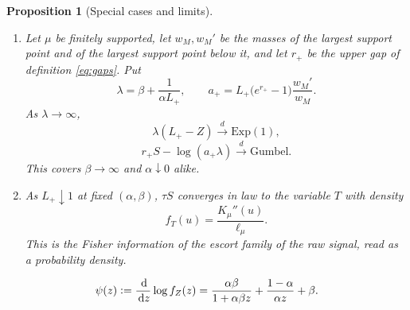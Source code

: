 \documentclass[10pt,a4paper]{amsart}
\newtheorem{proposition}{Proposition}
\providecommand{\Leh}{\mathscr{L}}
\providecommand{\dd}{\,\mathrm{d}}
\providecommand{\eqdef}{\mathrel{\vcentcolon=}}
\begin{document}
\begin{proposition}[Special cases and limits]
\begin{enumerate}[label=\textup{(\roman*)},leftmargin=2.2em]
			$Y=\Leh_\nu(S)-1=W_0(U)$ with $U$ uniform on $(0,1)$.
			\item Let $\mu$ be finitely supported, let $w_M,w_M'$ be the masses
			of the largest support point and of the largest support point
			below it, and let $r_+$ be the upper gap of definition
			\eqref{eq:gaps}. Put
			\begin{equation}\label{eq:lambdaa}
				\lambda=\beta+\frac{1}{\alpha L_+},
				\qquad
				a_+=L_+\bigl(e^{r_+}-1\bigr)\frac{w_M'}{w_M} .
			\end{equation}
			As $\lambda\to\infty$,
			\begin{equation}\label{eq:gumbel}
				\lambda(L_+-Z)\xrightarrow{d}\mathrm{Exp}(1),
			\end{equation}
			\begin{equation}\label{eq:gumbel2}
				r_+S-\log(a_+\lambda)\xrightarrow{d}\mathrm{Gumbel}.
			\end{equation}
			This covers $\beta\to\infty$ and $\alpha\downarrow0$ alike.
			\item As $L_+\downarrow1$ at fixed $(\alpha,\beta)$, $\tau S$
			converges in law to the variable $T$ with density
			\begin{equation}\label{eq:infoprofile}
				f_T(u)=\frac{K_\mu''(u)}{\ell_\mu} .
			\end{equation}
			This is the Fisher information of the escort family of the raw
			signal, read as a probability density.
		\end{enumerate}
	\end{proposition}

	\begin{equation}\label{eq:psi}
		\psi(z)\eqdef\frac{\dd}{\dd z}\log f_Z(z)
		=\frac{\alpha\beta}{1+\alpha\beta z}+\frac{1-\alpha}{\alpha z}+\beta .
	\end{equation}
\end{document}
